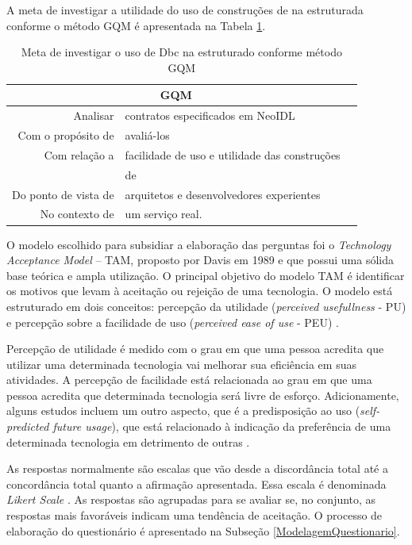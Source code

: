 A meta de investigar a utilidade do uso de construções de \designbycontract{} na
\neoidl{} estruturada conforme o método GQM é apresentada na Tabela
\ref{TabelaMetasGQM}.

\begin{table}[h]
\centering
\begin{tabular}{r|lr}
\multicolumn{2}{c}{GQM}\\
\hline    
Analisar & contratos especificados em NeoIDL \\
Com o propósito de  & avaliá-los \\
Com relação a & facilidade de uso e utilidade das construções \\
& de \designbycontract{} \\
Do ponto de vista de & arquitetos e desenvolvedores experientes \\
No contexto de & um serviço real.           
\end{tabular}
\caption{Meta de investigar o uso de Dbc na \neoidl{} estruturado conforme
método GQM}
\label{TabelaMetasGQM}
\end{table}

O modelo escolhido para subsidiar a elaboração das perguntas foi o
\textit{Technology Acceptance Model} -- TAM, proposto por Davis em 1989
\cite{davis1989perceived} e que possui uma sólida base teórica e ampla
utilização.
O principal objetivo do modelo TAM é identificar os motivos que levam à aceitação
ou rejeição de uma tecnologia. O modelo está estruturado em dois conceitos:
percepção da utilidade (\textit{perceived usefullness} - PU) e percepção sobre a
facilidade de uso (\textit{perceived ease of use} - PEU)
\cite{hernandes2010avaliaccao}.

Percepção de utilidade é medido com o grau em que uma pessoa acredita que
utilizar uma determinada tecnologia vai melhorar sua eficiência em suas
atividades. A percepção de facilidade está relacionada ao grau em que uma pessoa
acredita que determinada tecnologia será livre de esforço. Adicionamente, alguns
estudos incluem um outro aspecto, que é a predisposição ao uso
(\textit{self-predicted future usage}), que está relacionado à indicação da 
preferência de uma determinada tecnologia em detrimento de outras \cite{laitenberger1998evaluating}.

As respostas normalmente são
escalas que vão desde a discordância total até a concordância total quanto a
afirmação apresentada. Essa escala é denominada \textit{Likert Scale}
\cite{allen2007likert}. As respostas são agrupadas para se avaliar se, no
conjunto, as respostas mais favoráveis indicam uma tendência de aceitação. O
processo de elaboração do questionário é apresentado na Subseção \ref{ModelagemQuestionario}.

